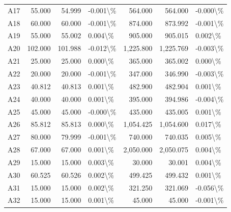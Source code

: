 \begin{table}
\begin{tabular}{lrrlrrl}
A17 & 55.000 & 54.999 & -0.001\textbackslash \% & 564.000 & 564.000 & -0.000\textbackslash \% \\
A18 & 60.000 & 60.000 & -0.001\textbackslash \% & 874.000 & 873.992 & -0.001\textbackslash \% \\
A19 & 55.000 & 55.002 & 0.004\textbackslash \% & 905.000 & 905.015 & 0.002\textbackslash \% \\
A20 & 102.000 & 101.988 & -0.012\textbackslash \% & 1,225.800 & 1,225.769 & -0.003\textbackslash \% \\
A21 & 25.000 & 25.000 & 0.000\textbackslash \% & 365.000 & 365.002 & 0.000\textbackslash \% \\
A22 & 20.000 & 20.000 & -0.001\textbackslash \% & 347.000 & 346.990 & -0.003\textbackslash \% \\
A23 & 40.812 & 40.813 & 0.001\textbackslash \% & 482.900 & 482.904 & 0.001\textbackslash \% \\
A24 & 40.000 & 40.000 & 0.001\textbackslash \% & 395.000 & 394.986 & -0.004\textbackslash \% \\
A25 & 45.000 & 45.000 & -0.000\textbackslash \% & 435.000 & 435.005 & 0.001\textbackslash \% \\
A26 & 85.812 & 85.813 & 0.000\textbackslash \% & 1,054.425 & 1,054.600 & 0.017\textbackslash \% \\
A27 & 80.000 & 79.999 & -0.001\textbackslash \% & 740.000 & 740.035 & 0.005\textbackslash \% \\
A28 & 67.000 & 67.000 & 0.001\textbackslash \% & 2,050.000 & 2,050.075 & 0.004\textbackslash \% \\
A29 & 15.000 & 15.000 & 0.003\textbackslash \% & 30.000 & 30.001 & 0.004\textbackslash \% \\
A30 & 60.525 & 60.526 & 0.002\textbackslash \% & 499.425 & 499.432 & 0.001\textbackslash \% \\
A31 & 15.000 & 15.000 & 0.002\textbackslash \% & 321.250 & 321.069 & -0.056\textbackslash \% \\
A32 & 15.000 & 15.000 & 0.001\textbackslash \% & 45.000 & 45.000 & -0.001\textbackslash \% \\
\bottomrule
\end{tabular}
\end{table}
